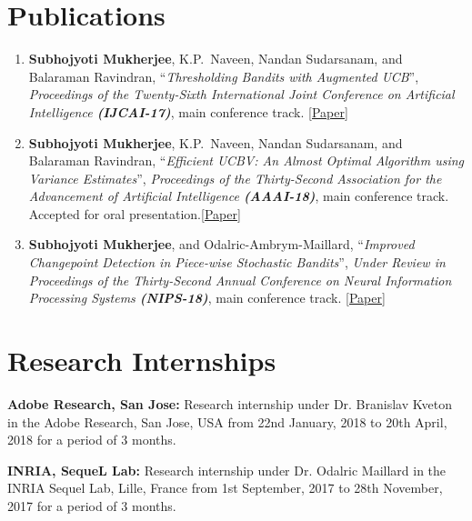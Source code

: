 \documentclass[margin,11pt]{res}
\begin{document}
\begin{resume}
\section{Publications}
\begin{enumerate}[leftmargin=*]
\item \textbf{Subhojyoti Mukherjee}, K.P.~Naveen, Nandan Sudarsanam, and Balaraman Ravindran, ``\textit{Thresholding Bandits with Augmented UCB}'', \textit{Proceedings of the Twenty-Sixth International Joint Conference on Artificial Intelligence \textbf{(IJCAI-17)}}, main conference track. \href{http://static.ijcai.org/proceedings-2017/0350.pdf}{[Paper]}
\item \textbf{Subhojyoti Mukherjee}, K.P.~Naveen, Nandan Sudarsanam, and Balaraman Ravindran, ``\textit{Efficient UCBV: An Almost Optimal Algorithm using Variance Estimates}'', \textit{Proceedings of the Thirty-Second Association for the Advancement of Artificial Intelligence \textbf{(AAAI-18)}}, main conference track. Accepted for oral presentation.\href{https://www.aaai.org/ocs/index.php/AAAI/AAAI18/paper/view/16111}{[Paper]}
\item \textbf{Subhojyoti Mukherjee}, and Odalric-Ambrym-Maillard, ``\textit{Improved Changepoint Detection in Piece-wise Stochastic Bandits}'', \textit{Under Review in Proceedings of the Thirty-Second Annual Conference on Neural Information Processing Systems  \textbf{(NIPS-18)}}, main conference track. \href{https://github.com/Subhojyoti/INRIA_Intern/blob/master/NIPS2018/nips_2018.pdf}{[Paper]}
\end{enumerate}


\section{Research Internships}
\textbf{Adobe Research, San Jose:} Research internship under Dr. Branislav Kveton in the Adobe Research, San Jose, USA from 22nd January, 2018 to 20th April, 2018 for a period of 3 months.

\textbf{INRIA, SequeL Lab:} Research internship under Dr. Odalric Maillard in the INRIA Sequel Lab, Lille, France from 1st September, 2017 to 28th November, 2017 for a period of 3 months.



\end{resume}
\end{document}
